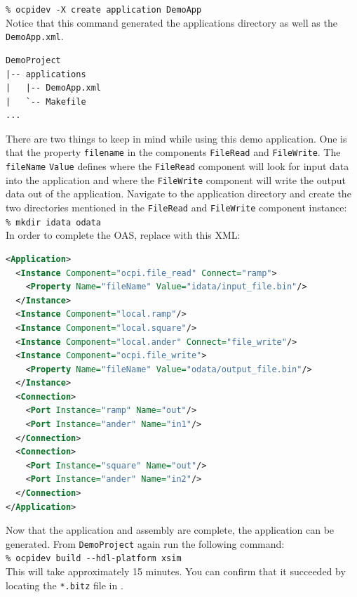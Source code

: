 \forceindent\verb+% ocpidev -X create application DemoApp+\\

Notice that this command generated the applications directory as well as the \verb+DemoApp.xml+.

\begin{verbatim}
DemoProject
|-- applications
|   |-- DemoApp.xml
|   `-- Makefile
...
\end{verbatim}

There are two things to keep in mind while using this demo application. One is that the property \verb+filename+ in the components \verb+FileRead+ and \verb+FileWrite+. The \verb+fileName+ \verb+Value+ defines where the \verb+FileRead+ component will look for input data into the application and where the \verb+FileWrite+ component will write the output data out of the application. \newline
\bstart
Navigate to the application directory and create the two directories mentioned in the \verb+FileRead+ and \verb+FileWrite+ component instance:\\

\forceindent\verb+% mkdir idata odata+\\
\bend
\bstart
In order to complete the OAS, replace  with this XML:
\begin{lstlisting}[language=xml]
<Application>
  <Instance Component="ocpi.file_read" Connect="ramp">
    <Property Name="fileName" Value="idata/input_file.bin"/>
  </Instance>
  <Instance Component="local.ramp"/>
  <Instance Component="local.square"/>
  <Instance Component="local.ander" Connect="file_write"/>
  <Instance Component="ocpi.file_write">
    <Property Name="fileName" Value="odata/output_file.bin"/>
  </Instance>
  <Connection>
    <Port Instance="ramp" Name="out"/>
    <Port Instance="ander" Name="in1"/>
  </Connection>
  <Connection>
    <Port Instance="square" Name="out"/>
    <Port Instance="ander" Name="in2"/>
  </Connection>
</Application>
\end{lstlisting}
\bend
Now that the application and assembly are complete, the application can be generated. From \verb+DemoProject+ again run the following command:\\

\forceindent\verb+% ocpidev build --hdl-platform xsim+\\

This will take approximately 15 minutes. You can confirm that it succeeded by locating the \texttt{*.bitz} file in .\\

